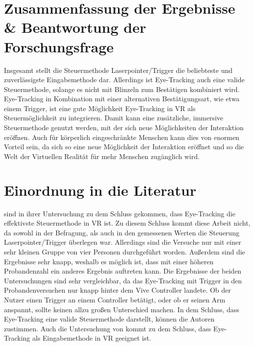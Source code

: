 \section{Zusammenfassung der Ergebnisse \& Beantwortung der Forschungsfrage}
Insgesamt stellt die Steuermethode Laserpointer/Trigger die beliebteste und zuverlässigste Eingabemethode dar. Allerdings ist Eye-Tracking auch eine valide Steuermethode, solange es nicht mit Blinzeln zum Bestätigen kombiniert wird. Eye-Tracking in Kombination mit einer alternativen Bestätigungsart, wie etwa einem Trigger, ist eine gute Möglichkeit Eye-Tracking in VR als Steuermöglichkeit zu integrieren. Damit kann eine zusätzliche, immersive Steuermethode genutzt werden, mit der sich neue Möglichkeiten der Interaktion eröffnen. Auch für körperlich eingeschränkte Menschen kann dies von enormen Vorteil sein, da sich so eine neue Möglichkeit der Interaktion eröffnet und so die Welt der Virtuellen Realität für mehr Menschen zugänglich wird. 

\section{Einordnung in die Literatur}
\citeauthor{Pai.2019} sind in ihrer Untersuchung zu dem Schluss gekommen, dass Eye-Tracking die effektivste Steuermethode in VR ist. Zu diesem Schluss kommt diese Arbeit nicht, da sowohl in der Befragung, als auch in den gemessenen Werten die Steuerung Laserpointer/Trigger überlegen war. Allerdings sind die Versuche nur mit einer sehr kleinen Gruppe von vier Personen durchgeführt worden. Außerdem sind die Ergebnisse sehr knapp, weshalb es möglich ist, dass mit einer höheren Probandenzahl ein anderes Ergebnis auftreten kann. Die Ergebnisse der beiden Untersuchungen sind  sehr vergleichbar, da das Eye-Tracking mit Trigger in den Probandenversuchen nur knapp hinter dem Vive Controller landete. Ob der Nutzer einen Trigger an einem Controller betätigt, oder ob er seinen Arm anspannt, sollte keinen allzu großen Unterschied machen. In dem Schluss, dass Eye-Tracking eine valide Steuermethode darstellt, können die Autoren \citeauthor{Pai.2019} zustimmen. Auch die Untersuchung von \citeauthor{D.Kumar.2016} kommt zu dem Schluss, dass Eye-Tracking als Eingabemethode in VR geeignet ist. \cite{D.Kumar.2016} \cite{Pai.2019}



	
